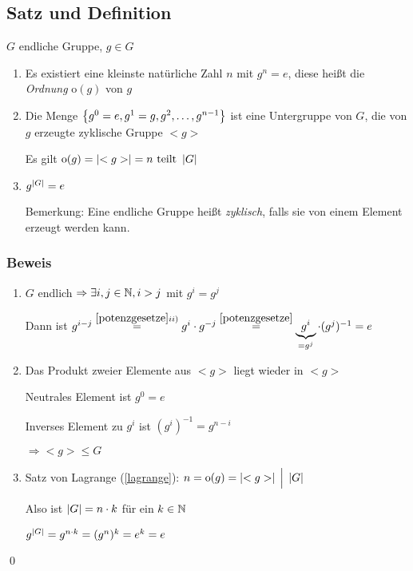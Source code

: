 \subsection[Satz und Definition: Ordnung, zyklische Gruppe]{Satz und Definition}

$G$ endliche Gruppe, $g \in G$

{\renewcommand{\labelenumi}{(\roman{enumi})}
\begin{enumerate}
	\item
	Es existiert eine kleinste natürliche Zahl $n$ mit $g^n = e$, diese heißt die \emph{Ordnung} $\mathrm{o}(g)$ von $g$ 
	
	\item
	Die Menge $\left\{g^0 = e, g^1 = g, g^2, \dots, g^{n-1}\right\}$ ist eine Untergruppe von $G$, die von $g$ erzeugte zyklische Gruppe $<g>$
	
	Es gilt $\mathrm{o}(g) = \left|<g>\right| = n \text{ teilt } \left|G\right|$
	
	\item
	$g^{\left|G\right|} = e$
	
	Bemerkung: Eine endliche Gruppe heißt \emph{zyklisch}, falls sie von einem Element erzeugt werden kann.
\end{enumerate}

\subsubsection*{Beweis}

\begin{enumerate}
	\item
	$G$ endlich $\Rightarrow \exists i, j \in \mathbb{N}, i > j$ mit $g^i=g^j$
	
	Dann ist $g^{i-j} \stackrel{\ref{potenzgesetze} ii)}{=} g^i \cdot g^{-j} \stackrel{\ref{potenzgesetze}}{=}\underbrace{g^i}_{=g^j} \cdot (g^j)^{-1} = e$
	
	\item
	Das Produkt zweier Elemente aus $<g>$ liegt wieder in $<g>$
	
	Neutrales Element ist $g^0 = e$
	
	Inverses Element zu $g^i$ ist $(g^i)^{-1} = g^{n-i}$
	
	$\Rightarrow <g> \leqslant G$
	
	\item
	Satz von Lagrange (\ref{lagrange}): $n = \mathrm{o}(g)= \left|<g>\right| \;\Big|\; \left|G\right|$
	
	Also ist $\left|G\right| = n \cdot k$ für ein $k \in \mathbb{N}$
	
	$g^{\left|G\right|} = g^{n \cdot k} = (g^{n})^k = e^k = e$ 
\end{enumerate}} \qed


